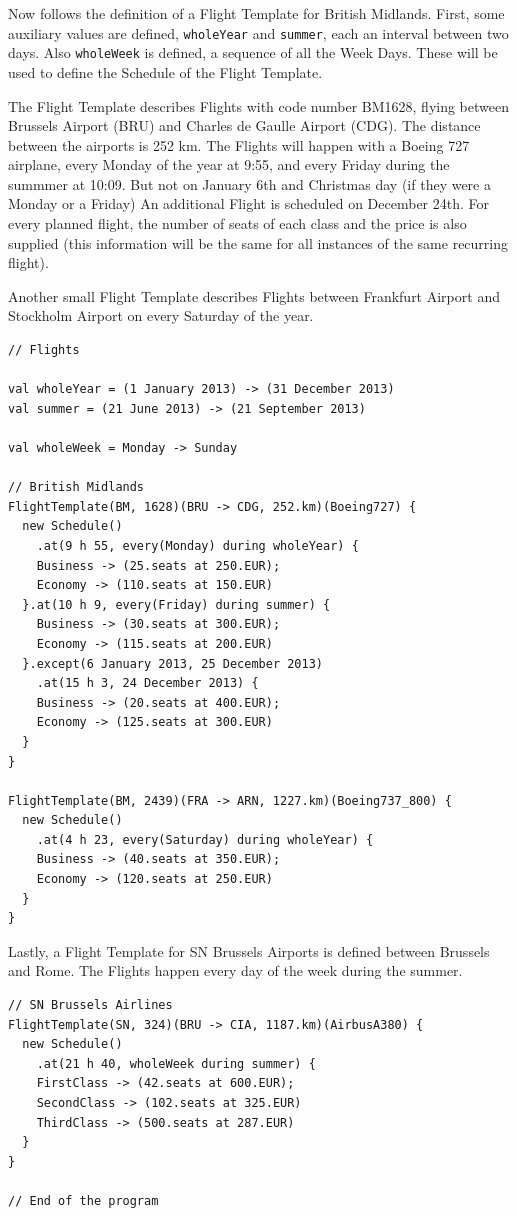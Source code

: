 \documentclass[a4paper]{article}
\renewcommand{\sc}[1]{\lstinline{#1}}
\begin{document}
Now follows the definition of a Flight Template for British Midlands.
First, some auxiliary values are defined, \sc{wholeYear} and \sc{summer}, each an interval between two days.
Also \sc{wholeWeek} is defined, a sequence of all the Week Days.
These will be used to define the Schedule of the Flight Template.

The Flight Template describes Flights with code number BM1628, flying between Brussels Airport (BRU) and Charles de Gaulle Airport (CDG).
The distance between the airports is 252 km.
The Flights will happen with a Boeing 727 airplane, every Monday of the year at 9:55, and every Friday during the summmer at 10:09.
But not on January 6th and Christmas day (if they were a Monday or a Friday)
An additional Flight is scheduled on December 24th.
For every planned flight, the number of seats of each class and the price is also supplied (this information will be the same for all instances of the same recurring flight).

Another small Flight Template describes Flights between Frankfurt Airport and Stockholm Airport on every Saturday of the year.

\begin{lstlisting}
// Flights

val wholeYear = (1 January 2013) -> (31 December 2013)
val summer = (21 June 2013) -> (21 September 2013)

val wholeWeek = Monday -> Sunday

// British Midlands
FlightTemplate(BM, 1628)(BRU -> CDG, 252.km)(Boeing727) {
  new Schedule()
    .at(9 h 55, every(Monday) during wholeYear) {
    Business -> (25.seats at 250.EUR);
    Economy -> (110.seats at 150.EUR)
  }.at(10 h 9, every(Friday) during summer) {
    Business -> (30.seats at 300.EUR);
    Economy -> (115.seats at 200.EUR)
  }.except(6 January 2013, 25 December 2013)
    .at(15 h 3, 24 December 2013) {
    Business -> (20.seats at 400.EUR);
    Economy -> (125.seats at 300.EUR)
  }
}

FlightTemplate(BM, 2439)(FRA -> ARN, 1227.km)(Boeing737_800) {
  new Schedule()
    .at(4 h 23, every(Saturday) during wholeYear) {
    Business -> (40.seats at 350.EUR);
    Economy -> (120.seats at 250.EUR)
  }
}
\end{lstlisting}

Lastly, a Flight Template for SN Brussels Airports is defined between Brussels and Rome.
The Flights happen every day of the week during the summer.

\begin{lstlisting}
// SN Brussels Airlines
FlightTemplate(SN, 324)(BRU -> CIA, 1187.km)(AirbusA380) {
  new Schedule()
    .at(21 h 40, wholeWeek during summer) {
    FirstClass -> (42.seats at 600.EUR);
    SecondClass -> (102.seats at 325.EUR)
    ThirdClass -> (500.seats at 287.EUR)
  }
}

// End of the program
\end{lstlisting}
\end{document}
